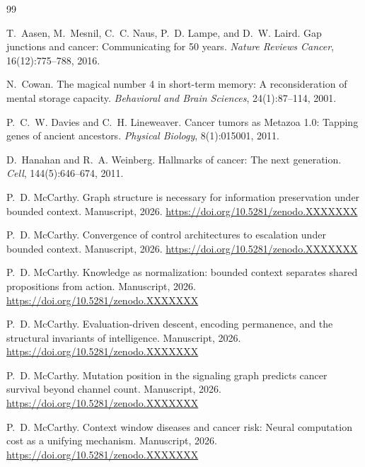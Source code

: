\documentclass[11pt]{article}
\begin{document}

\begin{thebibliography}{99}

T.~Aasen, M.~Mesnil, C.~C. Naus, P.~D. Lampe, and D.~W. Laird.
\newblock Gap junctions and cancer: Communicating for 50 years.
\newblock \emph{Nature Reviews Cancer}, 16(12):775--788, 2016.

N.~Cowan.
\newblock The magical number 4 in short-term memory: A reconsideration of
  mental storage capacity.
\newblock \emph{Behavioral and Brain Sciences}, 24(1):87--114, 2001.

P.~C.~W. Davies and C.~H. Lineweaver.
\newblock Cancer tumors as {Metazoa} 1.0: Tapping genes of ancient ancestors.
\newblock \emph{Physical Biology}, 8(1):015001, 2011.

D.~Hanahan and R.~A. Weinberg.
\newblock Hallmarks of cancer: The next generation.
\newblock \emph{Cell}, 144(5):646--674, 2011.

P.~D. McCarthy.
\newblock Graph structure is necessary for information preservation under
  bounded context.
\newblock Manuscript, 2026.
\newblock \url{https://doi.org/10.5281/zenodo.XXXXXXX}

P.~D. McCarthy.
\newblock Convergence of control architectures to escalation under bounded context.
\newblock Manuscript, 2026.
\newblock \url{https://doi.org/10.5281/zenodo.XXXXXXX}

P.~D. McCarthy.
\newblock Knowledge as normalization: bounded context separates shared
  propositions from action.
\newblock Manuscript, 2026.
\newblock \url{https://doi.org/10.5281/zenodo.XXXXXXX}

P.~D. McCarthy.
\newblock Evaluation-driven descent, encoding permanence, and the structural
  invariants of intelligence.
\newblock Manuscript, 2026.
\newblock \url{https://doi.org/10.5281/zenodo.XXXXXXX}

P.~D. McCarthy.
\newblock Mutation position in the signaling graph predicts cancer survival
  beyond channel count.
\newblock Manuscript, 2026.
\newblock \url{https://doi.org/10.5281/zenodo.XXXXXXX}

P.~D. McCarthy.
\newblock Context window diseases and cancer risk: Neural computation
  cost as a unifying mechanism.
\newblock Manuscript, 2026.
\newblock \url{https://doi.org/10.5281/zenodo.XXXXXXX}


\end{thebibliography}
\end{document}
